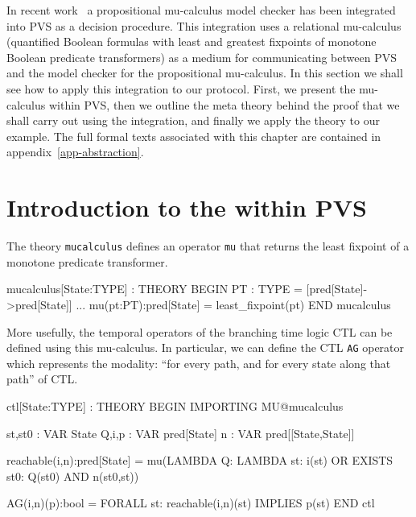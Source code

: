

In  recent work~\cite{SS:PVS.Integration} a propositional  mu-calculus
model checker \cite{Jan:Mu-calculus} has been integrated into PVS as a
decision  procedure.  This  integration uses a  relational mu-calculus
(quantified   Boolean formulas with  least   and greatest fixpoints of
monotone Boolean predicate transformers) as a medium for communicating
between PVS  and the model checker  for the propositional mu-calculus.
In this  section we  shall see how   to apply this  integration to our
protocol.  First, we   present  the mu-calculus  within PVS,  then  we
outline the meta theory behind the proof that we shall carry out using
the integration, and finally we apply the  theory to our example.  The
full formal texts  associated   with this  chapter  are  contained  in
appendix~\ref{app-abstraction}.


\section{Introduction to the \MuC{} within PVS}

The theory {\tt mucalculus} defines an  operator {\tt mu} that returns
the least fixpoint of a monotone predicate transformer.

\begin{smallsession}
  mucalculus[State:TYPE] : THEORY
    BEGIN
       PT : TYPE = [pred[State]->pred[State]]
       ...
       mu(pt:PT):pred[State] = least_fixpoint(pt)
    END mucalculus
\end{smallsession}

More usefully, the temporal operators of the branching time logic CTL can
be defined using this mu-calculus.  In particular, we can define the CTL
{\tt AG} operator which represents the modality: ``for every path, and for
every state along that path'' of CTL. 

\begin{smallsession}
  ctl[State:TYPE] : THEORY
  BEGIN
    IMPORTING MU@mucalculus

    st,st0 : VAR State
    Q,i,p : VAR pred[State]
    n : VAR pred[[State,State]] 

    reachable(i,n):pred[State] =
      mu(LAMBDA Q:
           LAMBDA st:
             i(st) OR
             EXISTS st0:
               Q(st0) AND n(st0,st))

    AG(i,n)(p):bool =
      FORALL st: reachable(i,n)(st) IMPLIES p(st)
  END ctl
\end{smallsession}

